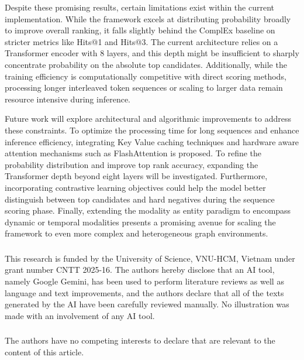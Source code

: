 \documentclass[runningheads]{llncs}
\begin{document}
Despite these promising results, certain limitations exist within the current implementation. While the framework excels at distributing probability broadly to improve overall ranking, it falls slightly behind the ComplEx baseline on stricter metrics like Hits@1 and Hits@3. The current architecture relies on a Transformer encoder with 8 layers, and this depth might be insufficient to sharply concentrate probability on the absolute top candidates. Additionally, while the training efficiency is computationally competitive with direct scoring methods, processing longer interleaved token sequences or scaling to larger data remain resource intensive during inference.

Future work will explore architectural and algorithmic improvements to address these constraints. To optimize the processing time for long sequences and enhance inference efficiency, integrating Key Value caching techniques and hardware aware attention mechanisms such as FlashAttention is proposed. To refine the probability distribution and improve top rank accuracy, expanding the Transformer depth beyond eight layers will be investigated. Furthermore, incorporating contrastive learning objectives could help the model better distinguish between top candidates and hard negatives during the sequence scoring phase. Finally, extending the modality as entity paradigm to encompass dynamic or temporal modalities presents a promising avenue for scaling the framework to even more complex and heterogeneous graph environments.

\begin{credits}
  \subsubsection{\ackname} This research is funded by the University of Science, VNU-HCM, Vietnam under grant number CNTT 2025-16. The authors hereby disclose that an AI tool, namely Google Gemini, has been used to perform literature reviews as well as language and text improvements, and the authors declare that all of the texts generated by the AI have been carefully reviewed manually. No illustration was made with an involvement of any AI tool.

  \subsubsection{\discintname}
  The authors have no competing interests to declare that are
  relevant to the content of this article.
\end{credits}
%
%
%


\end{document}

